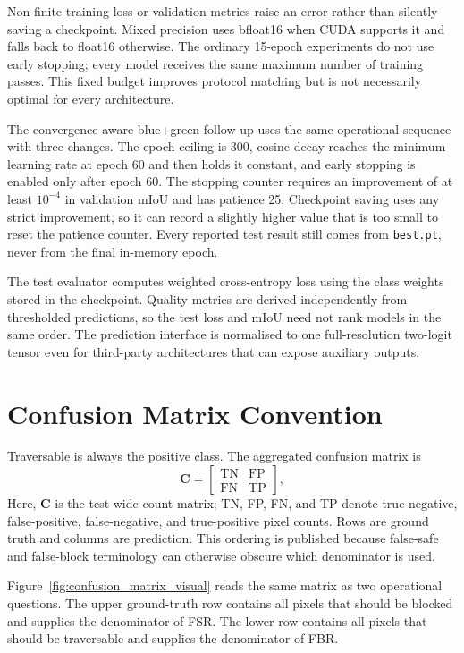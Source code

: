 Non-finite training loss or validation metrics raise an error rather than
silently saving a checkpoint. Mixed precision uses bfloat16 when CUDA supports
it and falls back to float16 otherwise. The ordinary 15-epoch experiments do
not use early stopping; every model receives the same maximum number of
training passes. This fixed budget improves protocol matching but is not
necessarily optimal for every architecture.

The convergence-aware blue+green follow-up uses the same operational sequence
with three changes. The epoch ceiling is 300, cosine decay reaches the minimum
learning rate at epoch 60 and then holds it constant, and early stopping is
enabled only after epoch 60. The stopping counter requires an improvement of
at least $10^{-4}$ in validation mIoU and has patience 25. Checkpoint saving
uses any strict improvement, so it can record a slightly higher value that is
too small to reset the patience counter. Every reported test result still
comes from \texttt{best.pt}, never from the final in-memory epoch.

The test evaluator computes weighted cross-entropy loss using the class weights
stored in the checkpoint. Quality metrics are derived independently from
thresholded predictions, so the test loss and mIoU need not rank models in the
same order. The prediction interface is normalised to one full-resolution
two-logit tensor even for third-party architectures that can expose auxiliary
outputs.

\section{Confusion Matrix Convention}

Traversable is always the positive class. The aggregated confusion matrix is
\begin{equation}
\mathbf{C}=
\begin{bmatrix}
 \mathrm{TN} & \mathrm{FP}\\
 \mathrm{FN} & \mathrm{TP}
\end{bmatrix},
\label{eq:confusion_convention}
\end{equation}
Here, $\mathbf{C}$ is the test-wide count matrix; TN, FP, FN, and TP denote
true-negative, false-positive, false-negative, and true-positive pixel counts.
Rows are ground truth and columns are prediction. This ordering is
published because false-safe and false-block terminology can otherwise obscure
which denominator is used.

Figure~\ref{fig:confusion_matrix_visual} reads the same matrix as two
operational questions. The upper ground-truth row contains all pixels that
should be blocked and supplies the denominator of FSR. The lower row contains
all pixels that should be traversable and supplies the denominator of FBR.

